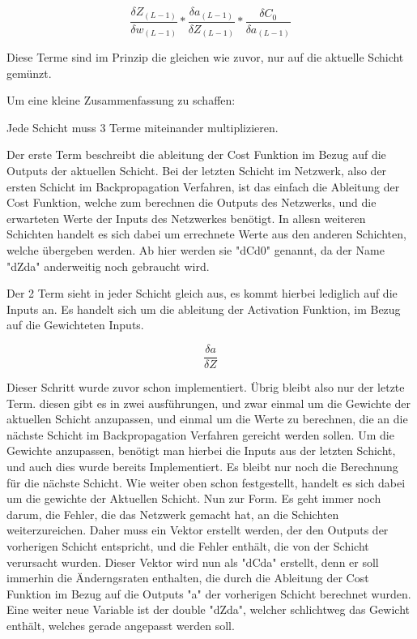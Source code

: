 \documentclass[12pt]{article}
\begin{document}
$$
\frac{\delta Z_{(L-1)}}{\delta w_{(L-1)}}*
\frac{\delta a_{(L-1)}}{\delta Z_{(L-1)}}*
\frac{\delta C_0}{\delta a_{(L-1)}}
$$

Diese Terme sind im Prinzip die gleichen wie zuvor, nur auf die aktuelle Schicht gemünzt. 

Um eine kleine Zusammenfassung zu schaffen:

Jede Schicht muss 3 Terme miteinander multiplizieren. 

Der erste Term beschreibt die ableitung der Cost Funktion im Bezug auf die Outputs der aktuellen Schicht. Bei der letzten Schicht im Netzwerk, also der ersten Schicht im Backpropagation Verfahren, ist das einfach die Ableitung der Cost Funktion, welche zum berechnen die Outputs des Netzwerks, und die erwarteten Werte der Inputs des Netzwerkes benötigt. In allesn weiteren Schichten handelt es sich dabei um errechnete Werte aus den anderen Schichten, welche übergeben werden. Ab hier werden sie "dCd0" genannt, da der Name "dZda" anderweitig noch gebraucht wird.

Der 2 Term sieht in jeder Schicht gleich aus, es kommt hierbei lediglich auf die Inputs an. Es handelt sich um die ableitung der Activation Funktion, im Bezug auf die Gewichteten Inputs.

$$\frac{\delta a}{\delta Z}$$

Dieser Schritt wurde zuvor schon implementiert.
Übrig bleibt also nur der letzte Term. diesen gibt es in zwei ausführungen, und zwar einmal um die Gewichte der aktuellen Schicht anzupassen, und einmal um die Werte zu berechnen, die an die nächste Schicht im Backpropagation Verfahren gereicht werden sollen.
Um die Gewichte anzupassen, benötigt man hierbei die Inputs aus der letzten Schicht, und auch dies wurde bereits Implementiert. Es bleibt nur noch die Berechnung für die nächste Schicht. Wie weiter oben schon festgestellt, handelt es sich dabei um die gewichte der Aktuellen Schicht. 
Nun zur Form. Es geht immer noch darum, die Fehler, die das Netzwerk gemacht hat, an die Schichten weiterzureichen. Daher muss ein Vektor erstellt werden, der den Outputs der vorherigen Schicht entspricht, und die Fehler enthält, die von der Schicht verursacht wurden.
Dieser Vektor wird nun als "dCda" erstellt, denn er soll immerhin die Änderngsraten enthalten, die durch die Ableitung der Cost Funktion im Bezug auf die Outputs "a" der vorherigen Schicht berechnet wurden. Eine weiter neue Variable ist der double "dZda", welcher schlichtweg das Gewicht enthält, welches gerade angepasst werden soll.
\end{document}
